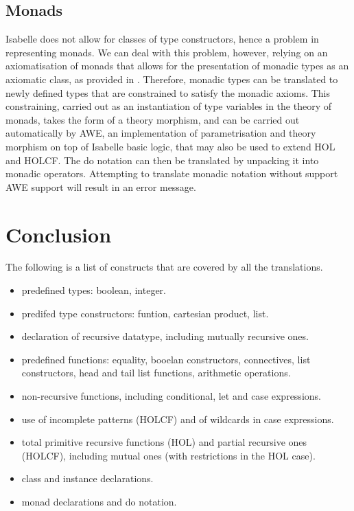 \documentclass[a4paper,12pt]{article}
\begin{document}
\subsection*{Monads}

Isabelle does not allow for classes of type constructors, hence a
problem in representing monads. We can deal with this problem,
however, relying on an axiomatisation of monads that allows for the
presentation of monadic types as an axiomatic class, as provided in
\cite{}. Therefore, monadic types can be translated to newly defined
types that are constrained to satisfy the monadic axioms. This
constraining, carried out as an instantiation of type variables in the
theory of monads, takes the form of a theory morphism, and can be
carried out automatically by AWE, an implementation of parametrisation
and theory morphism on top of Isabelle basic logic, that may also be
used to extend HOL and HOLCF. The do notation can then be translated
by unpacking it into monadic operators. Attempting to translate
monadic notation without support AWE support will result in an error
message.


\section*{Conclusion}


The following is a list of constructs that are covered by all the
translations.

\begin{itemize} 
\item predefined types: boolean, integer.
\item predifed type constructors: funtion, cartesian product, list.
\item declaration of recursive datatype, including mutually recursive ones.
\item predefined functions: equality, booelan constructors,
  connectives, list constructors, head and tail list functions,
  arithmetic operations.
\item non-recursive functions, including conditional, 
let and case expressions.
\item use of incomplete patterns (HOLCF) and of wildcards in case
  expressions.
\item total primitive recursive functions (HOL)
and partial recursive ones (HOLCF), including mutual ones (with
restrictions in the HOL case).
\item class and instance declarations. 
\item monad declarations and do notation.
\end{itemize}
\end{document}
